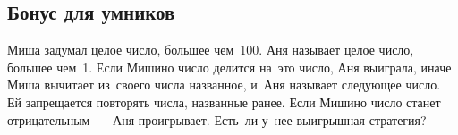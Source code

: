 \subsection*{Бонус для умников}
  
\begin{problems}


\item
Миша задумал целое число, большее чем~100.
Аня называет целое число, большее чем~1.
Если Мишино число делится на~это число, Аня выиграла, иначе Миша вычитает
из~своего числа названное, и~Аня называет следующее число.
Ей запрещается повторять числа, названные ранее.
Если Мишино число станет отрицательным~--- Аня проигрывает.
Есть~ли у~нее выигрышная стратегия?

\end{problems}

